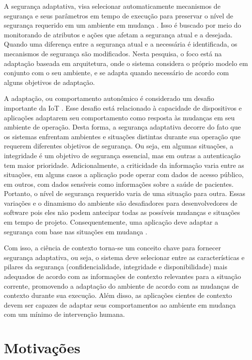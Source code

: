 \documentclass[tid,table]{texufpel} %
\begin{document}
A segurança adaptativa, visa selecionar automaticamente mecanismos de segurança e seus parâmetros em tempo de execução para preservar o nível de segurança requerido em um ambiente em mudança \cite{evesti13a}. Isso é buscado  por meio do monitorando de atributos e ações que afetam a segurança atual e a desejada. Quando uma diferença entre a segurança atual e a necessária é identificada, os mecanismos de segurança são modificados. Nesta pesquisa, o foco está na adaptação baseada em arquitetura, onde o sistema considera o próprio modelo em conjunto com o seu ambiente, e se adapta quando necessário de acordo com alguns objetivos de adaptação.

A adaptação, ou comportamento autonômico é considerado um desafio importante da IoT \cite{aman16, alaba17, gartnerttrends17}. Esse desafio está relacionado à capacidade de dispositivos e aplicações adaptarem seu comportamento como resposta às mudanças em seu ambiente de operação. Desta forma, a segurança adaptativa decorre do fato que os sistemas enfrentam ambientes e situações distintas durante sua operação que requerem diferentes objetivos de segurança. Ou seja, em algumas situações, a integridade é um objetivo de segurança essencial, mas em outras a autenticação tem maior prioridade. Adicionalmente, a criticidade da informação varia entre as situações, em alguns casos a aplicação pode operar com dados de acesso público, em outros, com dados sensíveis como informações sobre a saúde de pacientes. Portanto, o nível de segurança requerido varia de uma situação para outra. Essas variações e o dinamismo do ambiente são desafiadores para desenvolvedores de software pois eles não podem antecipar todas as possíveis mudanças e situações em tempo de projeto. Consequentemente, uma aplicação deve adaptar a segurança com base nas situações em mudança \cite{evesti13a}.

Com isso, a ciência de contexto torna-se um conceito chave para fornecer segurança adaptativa, ou seja, o sistema deve selecionar entre as características e pilares da segurança (confidencialidade, integridade e disponibilidade) mais adequados de acordo com as informações de contexto relevantes para a situação corrente, promovendo a adaptação do ambiente de acordo com as mudanças de contexto durante sua execução. Além disso, as aplicações cientes de contexto devem ser capazes de adaptar seus comportamentos ao ambiente em mudança com um mínimo de intervenção humana.


\section{Motivações}
\end{document}
